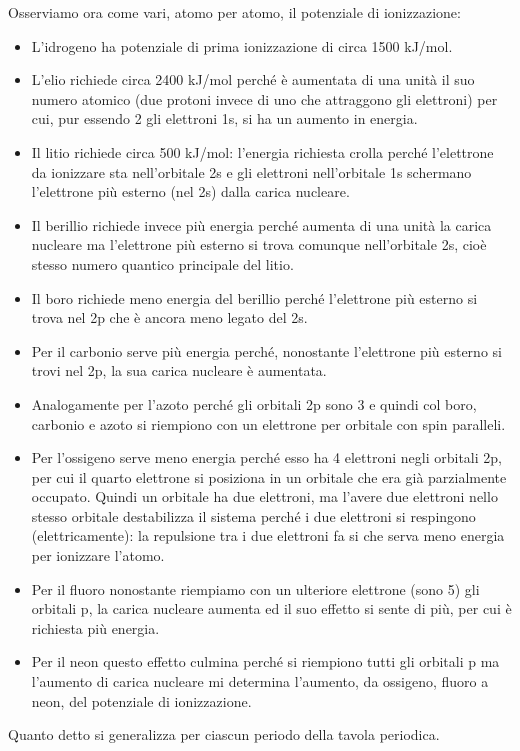 Osserviamo ora come vari, atomo per atomo, il potenziale di ionizzazione:
\begin{itemize}
    \item L'idrogeno ha potenziale di prima ionizzazione di circa 1500  kJ/mol.
    \item L'elio richiede circa 2400 kJ/mol perché è aumentata di una unità il suo numero atomico (due protoni invece di uno che attraggono gli elettroni) per cui, pur essendo 2 gli elettroni 1s, si ha un aumento in energia.
    \item Il litio richiede circa 500 kJ/mol: l'energia richiesta crolla perché l'elettrone da ionizzare sta nell'orbitale 2s e gli elettroni nell'orbitale 1s schermano l'elettrone più esterno (nel 2s) dalla carica nucleare.
    \item Il berillio richiede invece più energia perché aumenta di una unità la carica nucleare ma l'elettrone più esterno si trova comunque nell'orbitale 2s, cioè stesso numero quantico principale del litio. 
    \item Il boro richiede meno energia del berillio perché l'elettrone più esterno si trova nel 2p che è ancora meno legato del 2s.
    \item Per il carbonio serve più energia perché, nonostante l'elettrone più esterno si trovi nel 2p, la sua carica nucleare è aumentata.
    \item Analogamente per l'azoto perché gli orbitali 2p sono 3 e quindi col boro, carbonio e azoto si riempiono con un elettrone per orbitale con spin paralleli.
    \item Per l'ossigeno serve meno energia perché esso ha 4 elettroni negli orbitali 2p, per cui il quarto elettrone si posiziona in un orbitale che era già parzialmente occupato. Quindi un orbitale ha due elettroni, ma l'avere due elettroni nello stesso orbitale destabilizza il sistema perché i due elettroni si respingono (elettricamente): la repulsione tra i due elettroni fa si che serva meno energia per ionizzare l'atomo.
    \item Per il fluoro nonostante riempiamo con un ulteriore elettrone (sono 5) gli orbitali p, la carica nucleare aumenta ed il suo effetto si sente di più, per cui è richiesta più energia.
    \item Per il neon questo effetto culmina perché si riempiono tutti gli orbitali p ma l'aumento di carica nucleare mi determina l'aumento, da ossigeno, fluoro a neon, del potenziale di ionizzazione.
\end{itemize}
Quanto detto si generalizza per ciascun periodo della tavola periodica.
